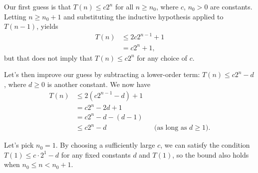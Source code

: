 Our first guess is that $T(n)\le c2^n$ for all $n\ge n_0$, where $c$, $n_0>0$ are constants.
Letting $n\ge n_0+1$ and substituting the inductive hypothesis applied to $T(n-1)$, yields
\begin{align*}
    T(n) &\le 2c2^{n-1}+1 \\
    &= c2^n+1,
\end{align*}
but that does not imply that $T(n)\le c2^n$ for any choice of $c$.

Let's then improve our guess by subtracting a lower-order term: $T(n)\le c2^n-d$, where $d\ge0$ is another constant.
We now have
\begin{align*}
    T(n) &\le 2(c2^{n-1}-d)+1 \\
    &= c2^n-2d+1 \\
    &= c2^n-d-(d-1) \\
    &\le c2^n-d && \text{(as long as $d\ge1$)}.
\end{align*}

Let's pick $n_0=1$.
By choosing a sufficiently large $c$, we can satisfy the condition $T(1)\le c\cdot2^1-d$ for any fixed constants $d$ and $T(1)$, so the bound also holds when $n_0\le n<n_0+1$.
